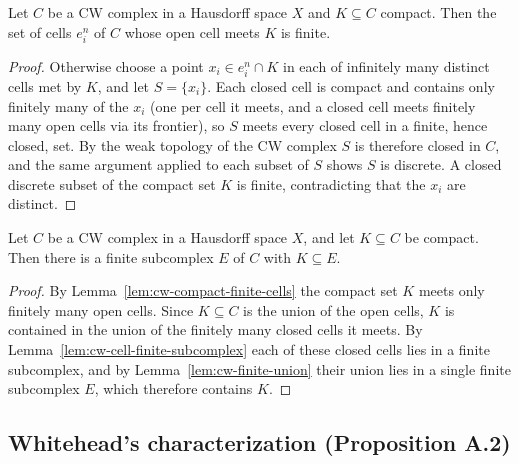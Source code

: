 \begin{lemma}
    \label{lem:cw-compact-finite-cells}
    \leanok
    Let $C$ be a CW complex in a Hausdorff space $X$ and $K \subseteq C$
    compact. Then the set of cells $e^n_i$ of $C$ whose open cell meets $K$ is
    finite.
\end{lemma}
\begin{proof}
    Otherwise choose a point $x_i \in e^n_i \cap K$ in each of infinitely many
    distinct cells met by $K$, and let $S = \{x_i\}$. Each closed cell is
    compact and contains only finitely many of the $x_i$ (one per cell it
    meets, and a closed cell meets finitely many open cells via its frontier),
    so $S$ meets every closed cell in a finite, hence closed, set. By the weak
    topology of the CW complex $S$ is therefore closed in $C$, and the same
    argument applied to each subset of $S$ shows $S$ is discrete. A closed
    discrete subset of the compact set $K$ is finite, contradicting that the
    $x_i$ are distinct.
\end{proof}

\begin{proposition}
    \label{prop:compact-in-finite-subcomplex}
    \leanok
    Let $C$ be a CW complex in a Hausdorff space $X$, and let $K \subseteq C$ be
    compact. Then there is a finite subcomplex $E$ of $C$ with $K \subseteq E$.
\end{proposition}
\begin{proof}
    By Lemma~\ref{lem:cw-compact-finite-cells} the compact set $K$ meets only
    finitely many open cells. Since $K \subseteq C$ is the union of the open
    cells, $K$ is contained in the union of the finitely many closed cells it
    meets. By Lemma~\ref{lem:cw-cell-finite-subcomplex} each of these closed
    cells lies in a finite subcomplex, and by
    Lemma~\ref{lem:cw-finite-union} their union lies in a single finite
    subcomplex $E$, which therefore contains $K$.
\end{proof}

\subsection{Whitehead's characterization (Proposition A.2)}

